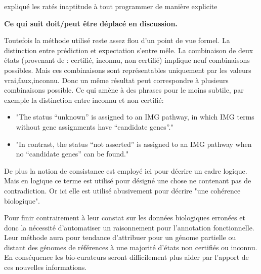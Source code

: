 \begin{refsegment}
expliqué les ratés
inaptitude à tout programmer de manière explicite

\textbf{Ce qui suit doit/peut être déplacé en discussion.}

Toutefois la méthode utilisé reste assez flou d'un point de vue formel. La distinction entre prédiction et expectation s'entre mêle. La combinaison de deux états (provenant de : certifié, inconnu, non certifié) implique neuf combinaisons possibles. Mais ces combinaisons sont représentables uniquement par les valeurs vrai,faux,inconnu. Donc un même résultat peut correspondre à plusieurs combinaisons possible. Ce qui amène à des phrases pour le moins subtile, par exemple la distinction entre inconnu et non certifié:
\begin{itemize}
    \item "The status “unknown” is assigned to an IMG pathway, in which IMG terms without gene assignments have “candidate genes”."
    \item "In contrast, the status “not asserted” is assigned to an IMG pathway when no “candidate genes” can be found."
\end{itemize}

De plus la notion de consistance est employé ici pour décrire un cadre logique. Mais en logique ce terme est utilisé pour désigné une chose ne contenant pas de contradiction. Or ici elle est utilisé abusivement pour décrire "une cohérence biologique".

Pour finir contrairement à leur constat sur les données biologiques erronées et donc la nécessité d'automatiser un raisonnement pour l'annotation fonctionnelle. Leur méthode aura pour tendance d'attribuer pour un génome partielle ou distant des génomes de références à une majorité d'états non certifiés ou inconnu. En conséquence les bio-curateurs seront difficilement plus aider par l'apport de ces nouvelles informations.




\end{refsegment}
